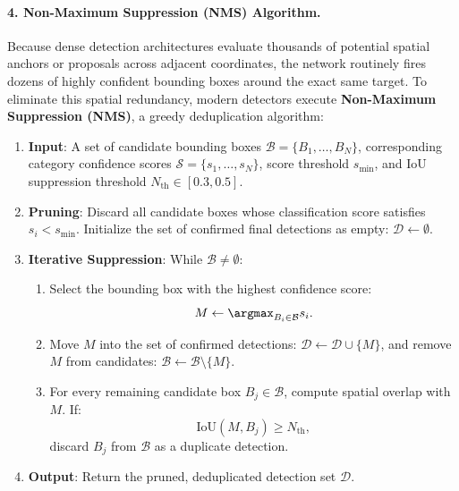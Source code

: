 \paragraph{4. Non-Maximum Suppression (NMS) Algorithm.}
Because dense detection architectures evaluate thousands of potential spatial anchors or proposals across adjacent coordinates, the network routinely fires dozens of highly confident bounding boxes around the exact same target. To eliminate this spatial redundancy, modern detectors execute \textbf{Non-Maximum Suppression (NMS)}, a greedy deduplication algorithm:
\begin{enumerate}[leftmargin=*]
  \item \textbf{Input}: A set of candidate bounding boxes $\mathcal{B} = \{B_1, \dots, B_N\}$, corresponding category confidence scores $\mathcal{S} = \{s_1, \dots, s_N\}$, score threshold $s_{\min}$, and IoU suppression threshold $N_{\text{th}} \in [0.3, 0.5]$.
  \item \textbf{Pruning}: Discard all candidate boxes whose classification score satisfies $s_i < s_{\min}$. Initialize the set of confirmed final detections as empty: $\mathcal{D} \leftarrow \emptyset$.
  \item \textbf{Iterative Suppression}: While $\mathcal{B} \neq \emptyset$:
    \begin{enumerate}[noitemsep]
      \item Select the bounding box with the highest confidence score:
        \begin{equation}
        M \leftarrow \argmax_{B_i \in \mathcal{B}} s_i.
        \end{equation}
      \item Move $M$ into the set of confirmed detections: $\mathcal{D} \leftarrow \mathcal{D} \cup \{M\}$, and remove $M$ from candidates: $\mathcal{B} \leftarrow \mathcal{B} \setminus \{M\}$.
      \item For every remaining candidate box $B_j \in \mathcal{B}$, compute spatial overlap with $M$. If:
        \begin{equation}
        \text{IoU}(M, B_j) \ge N_{\text{th}},
        \end{equation}
        discard $B_j$ from $\mathcal{B}$ as a duplicate detection.
    \end{enumerate}
  \item \textbf{Output}: Return the pruned, deduplicated detection set $\mathcal{D}$.
\end{enumerate}

